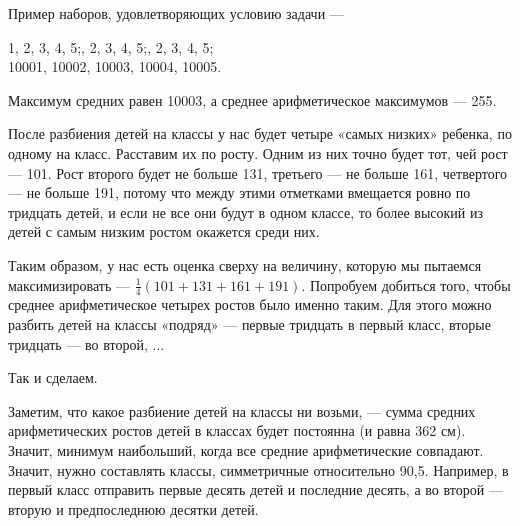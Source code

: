 ﻿

\begin{itemize}
\itA Пример наборов, удовлетворяющих условию задачи —

1, 2, 3, 4, 5;, 2, 3, 4, 5;, 2, 3, 4, 5;\quad\\
10001, 10002, 10003, 10004, 10005.

Максимум средних равен 10003, а среднее арифметическое максимумов — 255.

\itB После разбиения детей на классы у нас будет четыре «самых низких» ребенка, по одному на класс. Расставим их по росту. Одним из них точно будет тот, чей рост — \SI{101}{}. Рост второго будет не больше 131, третьего — не больше 161, четвертого — не больше 191, потому что между этими отметками вмещается ровно по тридцать детей, и если не все они будут в одном классе, то более высокий из детей с самым низким ростом окажется среди них.

Таким образом, у нас есть оценка сверху на величину, которую мы пытаемся максимизировать — $\tfrac{1}{4}(101+131+161+191)$. Попробуем добиться того, чтобы среднее арифметическое четырех ростов было именно таким. Для этого можно разбить детей на классы «подряд» — первые тридцать в первый класс, вторые тридцать — во второй, $\ldots$

Так и сделаем.

\itC Заметим, что какое разбиение детей на классы ни возьми, — сумма средних арифметических ростов детей в классах будет постоянна (и равна 362 см). Значит, минимум наибольший, когда все средние арифметические совпадают. Значит, нужно составлять классы, симметричные относительно 90,5. Например, в первый класс отправить первые десять детей и последние десять, а во второй — вторую и предпоследнюю десятки детей.
\end{itemize}